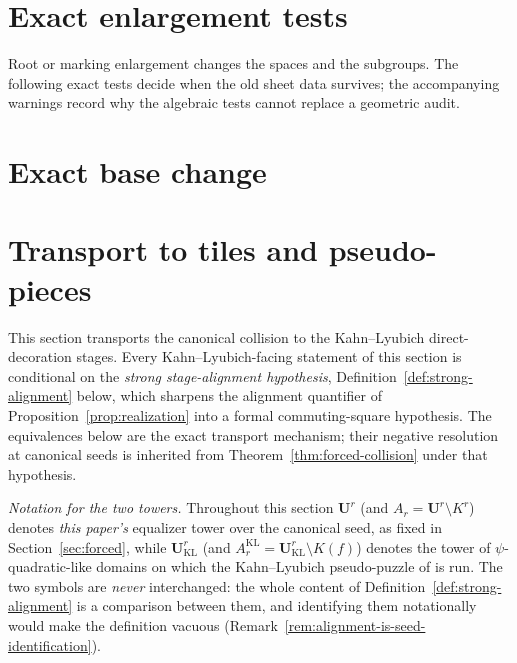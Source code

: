 \documentclass[11pt,reqno]{amsart}
\theoremstyle{definition}
\theoremstyle{remark}
\begin{document}
\section{Exact enlargement tests}
\label{sec:enlargement}

Root or marking enlargement changes the spaces and the subgroups.  The
following exact tests decide when the old sheet data survives; the
accompanying warnings record why the algebraic tests cannot replace a
geometric audit.




\section{Exact base change}
\label{sec:basechange}


\section{Transport to tiles and pseudo-pieces}
\label{sec:tiles}

This section transports the canonical collision to the Kahn--Lyubich
direct-decoration stages.  Every Kahn--Lyubich-facing statement of
this section is conditional on the \emph{strong stage-alignment
hypothesis}, Definition~\ref{def:strong-alignment} below, which
sharpens the alignment quantifier of
Proposition~\ref{prop:realization} into a formal commuting-square
hypothesis.  The equivalences below are the exact transport mechanism;
their negative resolution at canonical seeds is inherited from
Theorem~\ref{thm:forced-collision} under that hypothesis.

\emph{Notation for the two towers.}  Throughout this section
$\mathbf U^{r}$ (and $A_{r}=\mathbf U^{r}\setminus K^{r}$) denotes
\emph{this paper's} equalizer tower over the canonical seed, as fixed
in Section~\ref{sec:forced}, while
$\mathbf U_{\mathrm{KL}}^{r}$ (and
$A^{\mathrm{KL}}_{r}=\mathbf U_{\mathrm{KL}}^{r}\setminus K(f)$)
denotes the tower of $\psi$-quadratic-like domains on which the
Kahn--Lyubich pseudo-puzzle of
\cite[\S3.2]{KLDecorations08} is run.  The two symbols are
\emph{never} interchanged: the whole content of
Definition~\ref{def:strong-alignment} is a comparison between them,
and identifying them notationally would make the definition vacuous
(Remark~\ref{rem:alignment-is-seed-identification}).
\end{document}

